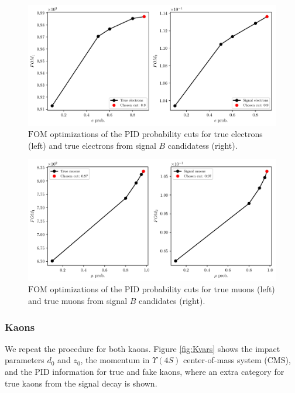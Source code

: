 \begin{figure}[H]
	\centering
	\captionsetup{width=.8\linewidth}
	\includegraphics[width=\linewidth]{fig/FSP_e_fom}
	\caption{$\mathrm{FOM}$ optimizations of the PID probability cuts for true electrons (left) and true electrons from signal $B$ candidatess (right).}
	\label{fig:efom}
\end{figure}

\begin{figure}[H]
	\centering
	\captionsetup{width=.8\linewidth}
	\includegraphics[width=\linewidth]{fig/FSP_mu_fom}
	\caption{$\mathrm{FOM}$ optimizations of the PID probability cuts for true muons (left) and true muons from signal $B$ candidates (right).}
	\label{fig:mufom}
\end{figure}


\subsubsection{Kaons}

We repeat the procedure for both kaons. Figure \ref{fig:Kvars} shows the impact parameters $d_0$ and $z_0$, the momentum in  $\Upsilon(4S)$ center-of-mass system (CMS), and the PID information for true and fake kaons, where an extra category for true kaons from the signal decay is shown.

